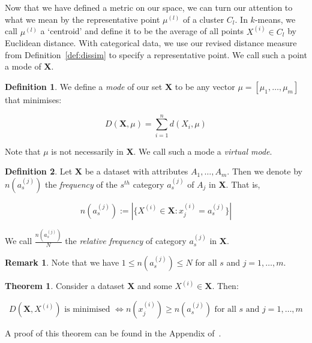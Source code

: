 \documentclass{article}
\theoremstyle{definition}
\newtheorem{definition}{Definition}[section]
\newtheorem{theorem}{Theorem}
\newtheorem*{remark}{Remark}
\begin{document}
Now that we have defined a metric on our space, we can turn our attention to 
what we mean by the representative point \(\mu^{(l)}\) of a cluster \(C_l\). In 
\(k\)-means, we call \(\mu^{(l)}\) a `centroid' and define it to be the average 
of all points \(X^{(i)} \in C_l\) by Euclidean distance. With categorical data, 
we use our revised distance measure from Definition~\ref{def:dissim} to specify 
a representative point. We call such a point a mode of \textbf{X}.\\

\begin{definition}\label{def:mode}
We define a \emph{mode} of our set \textbf{X} to be any vector \(\mu = 
[\mu_1, \ldots, \mu_m]\) that minimises:

\begin{equation}
	D(\textbf{X}, \mu) = \sum_{i=1}^{n} d(X_i, \mu)
\end{equation}

Note that \(\mu\) is not necessarily in \textbf{X}. We call such a mode a 
\emph{virtual mode}.
\end{definition}

\begin{definition}\label{def:rel-freq}
Let \textbf{X} be a dataset with attributes \(A_1, \ldots, A_m\). Then we denote
by \(n(a_s^{(j)})\) the \emph{frequency} of the \(s^{th}\) category 
\(a_s^{(j)}\) of \(A_j\) in \textbf{X}. That is, 

\[
    n(a_s^{(j)}) := |{\{X^{(i)} \in \textbf{X}: x_j^{(i)} = a_s^{(j)}\}}|
\]

We call \(\frac{n(a_s^{(j)})}{N}\) the \emph{relative frequency} of category 
\(a_s^{(j)}\) in \textbf{X}.
\end{definition}

\begin{remark}
    Note that we have \(1 \le n(a_s^{(j)}) \le N\) for all \(s\) and \(j = 1, 
    \ldots, m\).\\
\end{remark}

\begin{theorem}\label{theorem:1}
Consider a dataset \textbf{X} and some \(X^{(i)} \in \textbf{X}\). Then:

\[
    D(\textbf{X}, X^{(i)}) \text{ is minimised } \iff n(x_j^{(i)}) \geq 
    n(a_s^{(j)}) \text{ for all } s \text{ and } j = 1, \ldots, m 
\]
\end{theorem}
A proof of this theorem can be found in the Appendix of~\cite{Huang98}.\\
\end{document}

